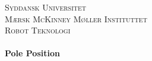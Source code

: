 \begin{titlepage}
\begin{center}




\textsc{\Huge Syddansk Universitet}\\[1.5cm]
\textsc{\huge \color{sdu_grey} Mærsk McKinney Møller Instituttet}\\[0.5cm]

\textsc{\LARGE \color{sdu_grey} Robot Teknologi}\\[0.5cm]

\HRule \\[1ex]
{ \Huge \bfseries Pole Position \\[1ex] }

\HRule \\[1.5cm]


\end{center}
\end{titlepage}
